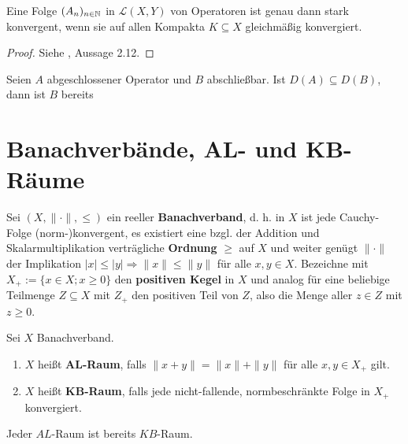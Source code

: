 \begin{fsatz}
Eine Folge  $(A_n)_{n\in\mathbb{N}}$ in $\mathcal L(X, Y)$ von Operatoren ist genau dann stark konvergent, wenn sie auf allen Kompakta $K\subseteq X$ gleichmäßig konvergiert.
\end{fsatz}

\begin{proof}
Siehe \cite{banasiak_arlotti_2006}, Aussage 2.12.
\end{proof}

\begin{fsatz}
Seien $A$ abgeschlossener Operator und $B$ abschließbar. Ist $D(A)\subseteq D(B)$, dann ist $B$ bereits 
\end{fsatz}







\section{Banachverbände, AL- und KB-Räume}

\par
Sei  $(X, \|\cdot\|,\leq)$ ein reeller \textbf{Banachverband}, d. h. in $X$ ist jede Cauchy-Folge (norm-)konvergent, es existiert eine bzgl. der Addition und Skalarmultiplikation verträgliche \textbf{Ordnung} $\geq$ auf $X$ und weiter genügt $\|\cdot\|$ der Implikation $|x|\leq |y|\Rightarrow \|x\|\leq \|y\|$ für alle $x,y\in X$. Bezeichne mit $X_+ := \{x\in X; x\geq0\}$ den \textbf{positiven Kegel} in $X$ und analog für eine beliebige Teilmenge $Z\subseteq X$  mit $Z_+$ den positiven Teil von $Z$, also die Menge aller $z\in Z$ mit $z\geq0$. 


\begin{defi} Sei $X$ Banachverband.
\begin{enumerate}
\item $X$ heißt \textbf{AL-Raum}, falls $\|x+y\|=\|x\|+\|y\|$ für alle $x,y\in X_+$ gilt.
\item $X$ heißt \textbf{KB-Raum}, falls jede nicht-fallende, normbeschränkte Folge in $X_+$ konvergiert.
\end{enumerate}
\end{defi}

\begin{fsatz}
Jeder $AL$-Raum ist bereits $KB$-Raum.
\end{fsatz}

